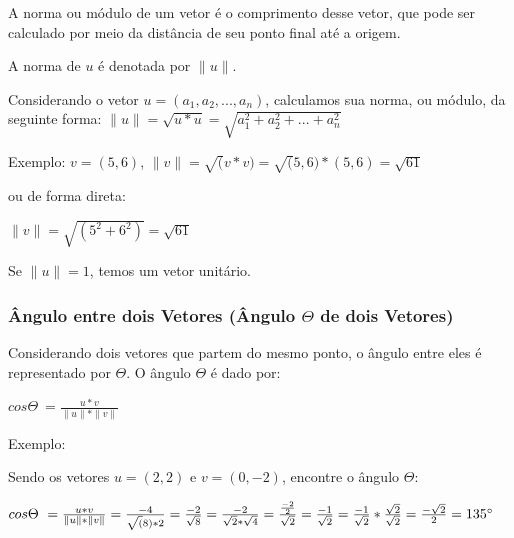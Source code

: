 \documentclass[12pt]{article}
\begin{document}
A norma ou módulo de um vetor é o comprimento desse vetor, que pode ser calculado por meio da distância de seu ponto final até a origem.

A norma de \( u \) é denotada por \( \| u \| \).

Considerando o vetor \(u = (a_{1}, a_{2}, ..., a_{n})\), calculamos sua norma, ou módulo, da seguinte forma\cite{lipschutz-algebra, anton2012algebra}: \( \|u\| = \sqrt{u*u} = \sqrt{a_{1}^2 + a_{2}^2 + ... + a_{n}^2} \) 

Exemplo: \(v = (5, 6)\), \(\|v\| = \sqrt(v*v) = \sqrt(5,6)*(5,6) = \sqrt{61}\)

ou de forma direta:

\(\|v\| = \sqrt{(5^2+6^2)} = \sqrt{61}\)


Se \(\|u\| = 1\), temos um vetor unitário.

\subsubsection{Ângulo entre dois Vetores (Ângulo $\Theta$ de dois Vetores)}

Considerando dois vetores que partem do mesmo ponto, o ângulo entre eles é representado por $\Theta$. O ângulo $\Theta$ é dado por:

\(cos \Theta\ = \frac{u * v}{\|u\|*\|v\|}\)

Exemplo:

Sendo os vetores \(u = (2,2)\) e \(v=(0, -2)\), encontre o ângulo $\Theta$:

\(cos \Theta\ = \frac{u * v}{\|u\|*\|v\|} = \frac{-4}{\sqrt(8)*2} = \frac{-2}{\sqrt{8}}=\frac{-2}{\sqrt{2}*\sqrt{4}}=\frac{\frac{-2}{2}}{\sqrt{2}} = \frac{-1}{\sqrt{2}} = \frac{-1}{\sqrt{2}} * \frac{\sqrt{2}}{\sqrt{2}} = \frac{-\sqrt{2}}{2} = 135\degree\)


\newpage

	
\end{document}
